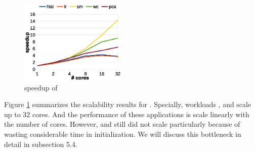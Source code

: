  


\begin{figure}[!h!t]  
	\centering
	\includegraphics[width=0.45\textwidth]{eps/dmr_speedup.eps}
	\caption{speedup of \myds}
	\label{fig:smr:speedup}
\end{figure}
Figure \ref{fig:smr:speedup} summarizes the scalability results for \myds.
Specially, workloads ,  and  scale up to 32 cores.
And the performance of these applications is scale linearly with the number of cores.
However,  and  still did not scale particularly because of wasting considerable time in initialization.
We will discuss this bottleneck in detail in subsection 5.4.











